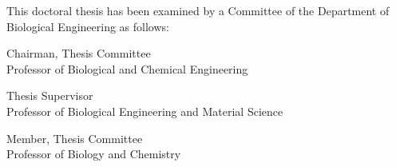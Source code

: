 \begin{titlepage}
\begin{large}
This doctoral thesis has been examined by a Committee of the Department
of Biological Engineering as follows:

\signature{Professor K. Dane Wittrup}{Chairman, Thesis Committee \\
   Professor of Biological and Chemical Engineering}

\signature{Professor Angela M. Belcher}{Thesis Supervisor \\
   Professor of Biological Engineering and Material Science}

\signature{Professor Cathy L. Drennan}{Member, Thesis Committee \\
   Professor of Biology and Chemistry}
\end{large}
\end{titlepage}

